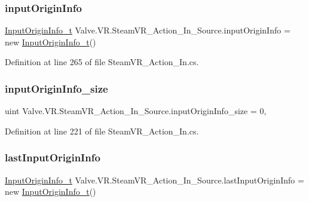 \subsubsection{\texorpdfstring{inputOriginInfo}{inputOriginInfo}}
{\footnotesize\ttfamily \mbox{\hyperlink{struct_valve_1_1_v_r_1_1_input_origin_info__t}{Input\+Origin\+Info\+\_\+t}} Valve.\+V\+R.\+Steam\+V\+R\+\_\+\+Action\+\_\+\+In\+\_\+\+Source.\+input\+Origin\+Info = new \mbox{\hyperlink{struct_valve_1_1_v_r_1_1_input_origin_info__t}{Input\+Origin\+Info\+\_\+t}}()\hspace{0.3cm}{\ttfamily [protected]}}



Definition at line 265 of file Steam\+V\+R\+\_\+\+Action\+\_\+\+In.\+cs.

\mbox{\label{class_valve_1_1_v_r_1_1_steam_v_r___action___in___source_a192b33ca9612e42e4180374bdfba5c14}} 
\subsubsection{\texorpdfstring{inputOriginInfo\_size}{inputOriginInfo\_size}}
{\footnotesize\ttfamily uint Valve.\+V\+R.\+Steam\+V\+R\+\_\+\+Action\+\_\+\+In\+\_\+\+Source.\+input\+Origin\+Info\+\_\+size = 0\hspace{0.3cm}{\ttfamily [static]}, {\ttfamily [protected]}}



Definition at line 221 of file Steam\+V\+R\+\_\+\+Action\+\_\+\+In.\+cs.

\mbox{\label{class_valve_1_1_v_r_1_1_steam_v_r___action___in___source_a307619ed4e0665f3996d46e3eab92c7c}} 
\subsubsection{\texorpdfstring{lastInputOriginInfo}{lastInputOriginInfo}}
{\footnotesize\ttfamily \mbox{\hyperlink{struct_valve_1_1_v_r_1_1_input_origin_info__t}{Input\+Origin\+Info\+\_\+t}} Valve.\+V\+R.\+Steam\+V\+R\+\_\+\+Action\+\_\+\+In\+\_\+\+Source.\+last\+Input\+Origin\+Info = new \mbox{\hyperlink{struct_valve_1_1_v_r_1_1_input_origin_info__t}{Input\+Origin\+Info\+\_\+t}}()\hspace{0.3cm}{\ttfamily [protected]}}



